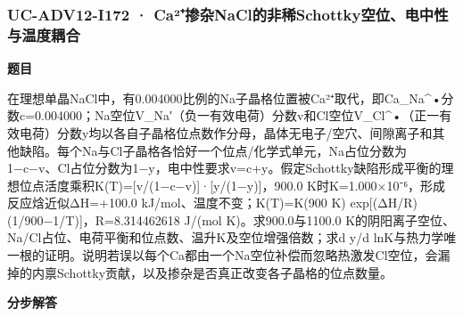 \documentclass[UTF8,11pt,a4paper]{ctexart}
\begin{document}
\subsubsection*{UC-ADV12-I172 · Ca²⁺掺杂NaCl的非稀Schottky空位、电中性与温度耦合}
\noindent\textbf{题目}\par
在理想单晶NaCl中，有0.004000比例的Na子晶格位置被Ca²⁺取代，即Ca\_Na\textasciicircum{}•分数c=0.004000；Na空位V\_Na′（负一有效电荷）分数v和Cl空位V\_Cl\textasciicircum{}•（正一有效电荷）分数y均以各自子晶格位点数作分母，晶体无电子/空穴、间隙离子和其他缺陷。每个Na与Cl子晶格各恰好一个位点/化学式单元，Na占位分数为1−c−v、Cl占位分数为1−y，电中性要求v=c+y。假定Schottky缺陷形成平衡的理想位点活度乘积K(T)=[v/(1−c−v)]·[y/(1−y)]，900.0 K时K=1.000×10⁻⁶，形成反应焓近似ΔH=+100.0 kJ/mol、温度不变；K(T)=K(900 K) exp[(ΔH/R)(1/900−1/T)]，R=8.314462618 J/(mol K)。求900.0与1100.0 K的阴阳离子空位、Na/Cl占位、电荷平衡和位点数、温升K及空位增强倍数；求d y/d lnK与热力学唯一根的证明。说明若误以每个Ca都由一个Na空位补偿而忽略热激发Cl空位，会漏掉的内禀Schottky贡献，以及掺杂是否真正改变各子晶格的位点数量。\par
\medskip\noindent\textbf{分步解答}
\end{document}

